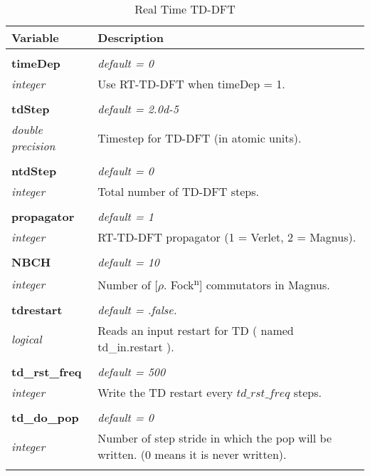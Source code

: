 \begin{Spacing}{1.0}
\begin{longtable}{ p{} p{} }

   \toprule
   \textbf{Variable} & Description \\*
   \midrule \\*
   \endhead

   \bottomrule
   \caption{Real Time TD-DFT}
   \endfoot

   \textbf{timeDep}
   &  \textit{default = 0}
   \\*\textit{integer}
   & Use RT-TD-DFT when timeDep = 1.\\* \\

   \textbf{tdStep}
   &  \textit{default = 2.0d-5}
   \\*\textit{double precision}
   & Timestep for TD-DFT (in atomic units).\\* \\

   \textbf{ntdStep}
   &  \textit{default = 0}
   \\*\textit{integer}
   & Total number of TD-DFT steps.\\* \\

   \textbf{propagator}
   &  \textit{default = 1}
   \\*\textit{integer}
   & RT-TD-DFT propagator (1 = Verlet, 2 = Magnus).\\* \\

   \textbf{NBCH}
   &  \textit{default = 10}
   \\*\textit{integer}
   & Number of [$\rho$. Fock\textsuperscript{n}] commutators
   in Magnus.\\* \\

   \textbf{tdrestart}
   &  \textit{default = .false. }
   \\*\textit{logical}
   & Reads an input restart for TD ( named td\_in.restart ).\\* \\

   \textbf{td\_rst\_freq}
   &  \textit{default = 500}
   \\*\textit{integer}
   & Write the TD restart every $td\_rst\_freq$ steps.\\* \\

   \textbf{td\_do\_pop}
   &  \textit{default = 0}
   \\*\textit{integer}
   & Number of step stride in which the pop will be written.
   (0 means it is never written).\\* \\


\end{longtable}
\end{Spacing}
